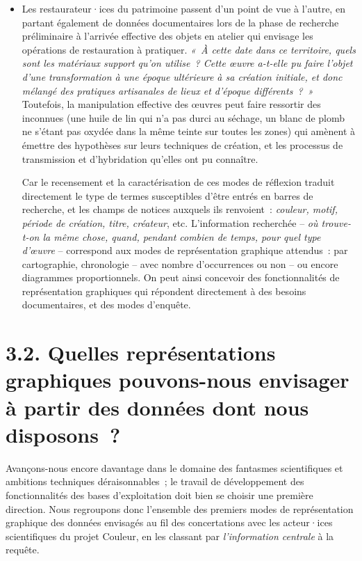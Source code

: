 \documentclass[a4paper,12pt, twoside]{book}
\begin{document}
\begin{itemize}
    \item Les restaurateur·ices du patrimoine passent d’un point de vue à l’autre, en partant également de données documentaires lors de la phase de recherche préliminaire à l’arrivée effective des objets en atelier qui envisage les opérations de restauration à pratiquer. \textit{«~À cette date dans ce territoire, quels sont les matériaux support qu’on utilise~? Cette œuvre a-t-elle pu faire l’objet d’une transformation à une époque ultérieure à sa création initiale, et donc mélangé des pratiques artisanales de lieux et d’époque différents~?~»} Toutefois, la manipulation effective des œuvres peut faire ressortir des inconnues (une huile de lin qui n’a pas durci au séchage, un blanc de plomb ne s’étant pas oxydée dans la même teinte sur toutes les zones) qui amènent à émettre des hypothèses sur leurs techniques de création, et les processus de transmission et d’hybridation qu’elles ont pu connaître.
    
    \medskip
    
    Car le recensement et la caractérisation de ces modes de réflexion traduit directement le type de termes susceptibles d’être entrés en barres de recherche, et les champs de notices auxquels ils renvoient~: \textit{couleur, motif, période de création, titre, créateur}, etc. L’information recherchée – \textit{où trouve-t-on la même chose, quand, pendant combien de temps, pour quel type d’œuvre} – correspond aux modes de représentation graphique attendus~: par cartographie, chronologie – avec nombre d’occurrences ou non – ou encore diagrammes proportionnels. On peut ainsi concevoir des fonctionnalités de représentation graphiques qui répondent directement à des besoins documentaires, et des modes d’enquête.
\end{itemize}   

\section*{3.2. Quelles représentations graphiques pouvons-nous envisager à partir des données dont nous disposons~?}

Avançons-nous encore davantage dans le domaine des fantasmes scientifiques et ambitions techniques déraisonnables~; le travail de développement des fonctionnalités des bases d’exploitation doit bien se choisir une première direction. Nous regroupons donc l’ensemble des premiers modes de représentation graphique des données envisagés au fil des concertations avec les acteur·ices scientifiques du projet Couleur, en les classant par \textit{l’information centrale} à la requête.
\end{document}
